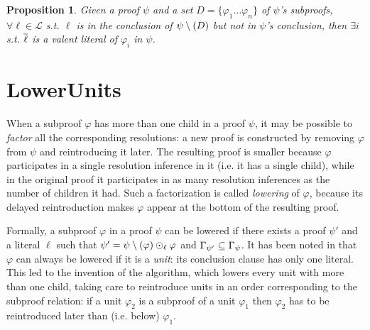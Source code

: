 \documentclass{easychair}
\newtheorem{proposition}{Proposition}
\begin{document}
\newcommand{\pedge}[3]{\ensuremath{\raiz{#1} \xrightarrow{#2} \raiz{#3}}}


\begin{proposition}
Given a proof $\psi$ and a set $D = \{\varphi_1 \ldots \varphi_n\}$ of $\psi$'s subproofs, $\forall
\ell \in \mathcal{L}$ s.t. $\ell$ is in the conclusion of $\psi \setminus (D)$ but not in $\psi$'s
conclusion, then $\exists i$ s.t. $\overline{\ell}$ is a valent literal of $\varphi_i$ in $\psi$.
\end{proposition}


\section{LowerUnits} \label{sec:LU}

When a subproof $\varphi$ has more than one child in a proof $\psi$, it may be possible to \emph{factor} all
the corresponding resolutions: a new proof is
constructed by removing $\varphi$ from $\psi$ and reintroducing it later. The resulting proof is smaller because $\varphi$ participates in a single resolution inference in it (i.e. it has a single child), while in the original proof it participates in as many resolution inferences as the number of children it had. Such a factorization is called \emph{lowering} of $\varphi$, because its delayed reintroduction makes $\varphi$ appear at the bottom of the resulting proof. 

Formally, a subproof $\varphi$ in a proof $\psi$ can be lowered if there exists a proof
$\psi'$ and a literal $\ell$ such that $\psi' = \psi \setminus (\varphi) \odot_{\ell} \varphi$ and
$\Gamma_{\psi'} \subseteq \Gamma_{\psi}$. It has been noted in \cite{LURPI} that $\varphi$ can always be lowered if it is a \emph{unit}: its conclusion clause has only one literal. This led to the invention of the {\LowerUnits} algorithm, which lowers every unit with more than one child, taking care to reintroduce units in
an order corresponding to the subproof relation: if a unit $\varphi_2$ is a subproof of a unit
$\varphi_1$ then $\varphi_2$ has to be reintroduced later than (i.e. below) $\varphi_1$.
\end{document}
